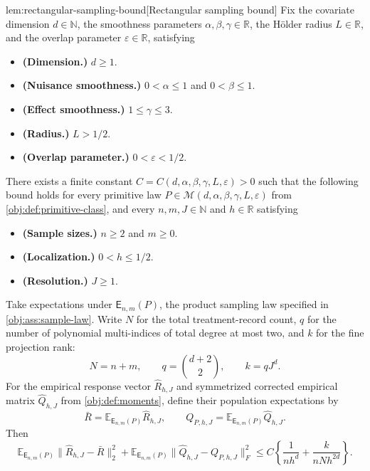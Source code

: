 \documentclass[11pt]{article}
\begin{document}
\begin{lemmav}{lem:rectangular-sampling-bound}[Rectangular sampling bound]
Fix the covariate dimension \(d\in\mathbb N\), the smoothness parameters \(\alpha,\beta,\gamma\in\mathbb R\), the Hölder radius \(L\in\mathbb R\), and the overlap parameter \(\varepsilon\in\mathbb R\), satisfying
\begin{itemize}
\item \textbf{(Dimension.)} \(d\ge1\).
\item \textbf{(Nuisance smoothness.)} \(0<\alpha\le1\) and \(0<\beta\le1\).
\item \textbf{(Effect smoothness.)} \(1\le\gamma\le3\).
\item \textbf{(Radius.)} \(L>1/2\).
\item \textbf{(Overlap parameter.)} \(0<\varepsilon<1/2\).
\end{itemize}
There exists a finite constant \(C=C(d,\alpha,\beta,\gamma,L,\varepsilon)>0\) such that the following bound holds for every primitive law
\(P\in\mathcal M(d,\alpha,\beta,\gamma,L,\varepsilon)\) from \cref{obj:def:primitive-class}, and every \(n,m,J\in\mathbb N\) and \(h\in\mathbb R\) satisfying
\begin{itemize}
\item \textbf{(Sample sizes.)} \(n\ge2\) and \(m\ge0\).
\item \textbf{(Localization.)} \(0<h\le1/2\).
\item \textbf{(Resolution.)} \(J\ge1\).
\end{itemize}
Take expectations under \(\mathsf E_{n,m}(P)\), the product sampling law specified in \cref{obj:ass:sample-law}. Write \(N\) for the total treatment-record count, \(q\) for the number of polynomial multi-indices of total degree at most two, and \(k\) for the fine projection rank:
\[
N=n+m,\qquad q=\binom{d+2}{2},\qquad k=qJ^d.
\]
For the empirical response vector \(\widehat R_{h,J}\) and symmetrized corrected empirical matrix \(\widehat Q_{h,J}\) from \cref{obj:def:moments}, define their population expectations by
\[
\bar R=\mathbb E_{\mathsf E_{n,m}(P)}\widehat R_{h,J},
\qquad
Q_{P,h,J}=\mathbb E_{\mathsf E_{n,m}(P)}\widehat Q_{h,J}.
\]
Then
\[
\mathbb E_{\mathsf E_{n,m}(P)}
 \bigl\|\widehat R_{h,J}-\bar R\bigr\|_2^2
+
\mathbb E_{\mathsf E_{n,m}(P)}
 \bigl\|\widehat Q_{h,J}-Q_{P,h,J}\bigr\|_F^2
\le
C\left\{\frac{1}{nh^d}+\frac{k}{nNh^{2d}}\right\}.
\]
\end{lemmav}
\end{document}
